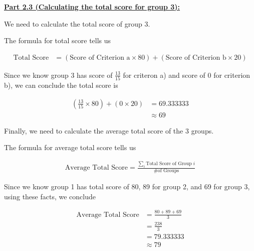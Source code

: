 \documentclass[12pt]{article}
\begin{document}
\begin{itemize}
    \bigskip

    \underline{\textbf{Part 2.3 (Calculating the total score for group 3):}}

    \bigskip

    We need to calculate the total score of group 3.

    \bigskip

    The formula for total score tells us

    \begin{align}
        \text{Total Score} &= (\text{Score of Criterion a} \times 80) + (\text{Score of Criterion b} \times 20)
    \end{align}

    \bigskip

    Since we know group 3 has score of $\frac{13}{15}$ for criteron a) and score of $0$ for
    criterion b), we can conclude the total score is

    \begin{align}
        (\frac{13}{15} \times 80) + (0 \times 20) &= 69.333333\\
        &\approx 69
    \end{align}

    \bigskip

    Finally, we need to calculate the average total score of the 3 groups.

    \bigskip

    The formula for average total score tells us

    \begin{align}
        \text{Average Total Score} = \frac{\sum\limits_{i} \text{Total Score of Group } i}{\text{\# of Groups}}
    \end{align}

    \bigskip

    Since we know group 1 has total score of 80, 89 for group 2, and 69
    for group 3, using these facts, we conclude

    \begin{align}
        \text{Average Total Score} &= \frac{80 + 89 + 69}{3}\\
        &= \frac{238}{3}\\
        &= 79.333333\\
        &\approx 79
    \end{align}
\end{itemize}
\end{document}
